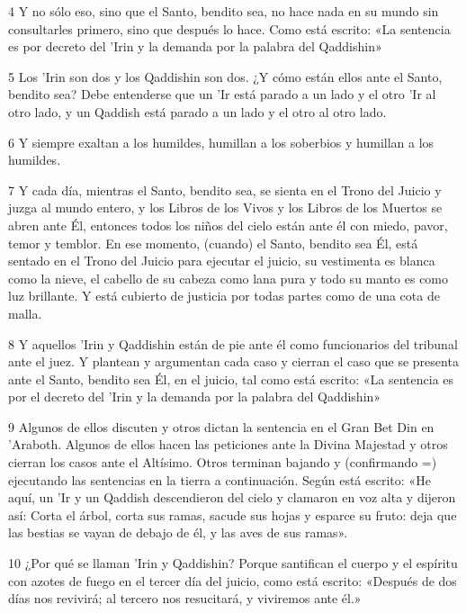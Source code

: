 \par 4 Y no sólo eso, sino que el Santo, bendito sea, no hace nada en su mundo sin consultarles primero, sino que después lo hace. Como está escrito: «La sentencia es por decreto del 'Irin y la demanda por la palabra del Qaddishin»

\par 5 Los 'Irin son dos y los Qaddishin son dos. ¿Y cómo están ellos ante el Santo, bendito sea? Debe entenderse que un 'Ir está parado a un lado y el otro 'Ir al otro lado, y un Qaddish está parado a un lado y el otro al otro lado.

\par 6 Y siempre exaltan a los humildes, humillan a los soberbios y humillan a los humildes.

\par 7 Y cada día, mientras el Santo, bendito sea, se sienta en el Trono del Juicio y juzga al mundo entero, y los Libros de los Vivos y los Libros de los Muertos se abren ante Él, entonces todos los niños del cielo están ante él con miedo, pavor, temor y temblor. En ese momento, (cuando) el Santo, bendito sea Él, está sentado en el Trono del Juicio para ejecutar el juicio, su vestimenta es blanca como la nieve, el cabello de su cabeza como lana pura y todo su manto es como luz brillante. Y está cubierto de justicia por todas partes como de una cota de malla.

\par 8 Y aquellos 'Irin y Qaddishin están de pie ante él como funcionarios del tribunal ante el juez. Y plantean y argumentan cada caso y cierran el caso que se presenta ante el Santo, bendito sea Él, en el juicio, tal como está escrito: «La sentencia es por el decreto del 'Irin y la demanda por la palabra del Qaddishin»

\par 9 Algunos de ellos discuten y otros dictan la sentencia en el Gran Bet Din en 'Araboth. Algunos de ellos hacen las peticiones ante la Divina Majestad y otros cierran los casos ante el Altísimo. Otros terminan bajando y (confirmando =) ejecutando las sentencias en la tierra a continuación. Según está escrito: «He aquí, un 'Ir y un Qaddish descendieron del cielo y clamaron en voz alta y dijeron así: Corta el árbol, corta sus ramas, sacude sus hojas y esparce su fruto: deja que las bestias se vayan de debajo de él, y las aves de sus ramas».

\par 10 ¿Por qué se llaman 'Irin y Qaddishin? Porque santifican el cuerpo y el espíritu con azotes de fuego en el tercer día del juicio, como está escrito: «Después de dos días nos revivirá; al tercero nos resucitará, y viviremos ante él.»

